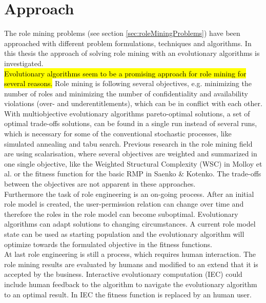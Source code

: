 \newpage
\chapter{Approach}
\label{sec:approach}
The role mining problems (see section \ref{sec:roleMiningProblems}) have been approached with different problem formulations, techniques and algorithms. In this thesis the approach of solving role mining with an evolutionary algorithms is investigated.\\
\hl{Evolutionary algorithms seem to be a promising approach for role mining for several reasons.} Role mining is following several objectives, e.g. minimizing the number of roles and minimizing the number of confidentiality and availability violations (over- and underentitlements), which can be in conflict with each other. With multiobjective evolutionary algorithms pareto-optimal solutions, a set of optimal trade-offs solutions, can be found in a single run instead of several runs, which is necessary for some of the conventional stochastic processes, like simulated annealing and tabu search\cite{abraham2005evolutionary}. Previous research in the role mining field are using scalarisation, where several objectives are weighted and summarized in one single objective, like the Weighted Structural Complexity (WSC) in Molloy et al.\cite{Molloy} or the fitness function for the basic RMP in Saenko \& Kotenko\cite{saenko2012design}. The trade-offs between the objectives are not apparent in these approaches.\\
Furthermore the task of role engineering is an on-going process. After an initial role model is created, the user-permission relation can change over time and therefore the roles in the role model can become suboptimal. Evolutionary algorithms can adapt solutions to changing circumstances\cite{Fogel:1997}. A current role model state can be used as starting population and the evolutionary algorithm will optimize towards the formulated objective in the fitness functions.\\
At last role engineering is still a process, which requires human interaction. The role mining results are evaluated by humans and modified to an extend that it is accepted by the business. Interactive evolutionary computation (IEC)\cite{949485} could include human feedback to the algorithm to navigate the evolutionary algorithm to an optimal result. In IEC the fitness function is replaced by an human user.\\\fi


